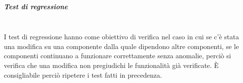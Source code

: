 \subparagraph{Test di regressione} \mbox{}\\
I test di regressione hanno come obiettivo di verifica nel caso in cui se c’è stata una modifica su una componente dalla quale dipendono altre componenti, se le componenti continuano a funzionare correttamente senza anomalie, perciò si verifica che una modifica non pregiudichi le funzionalità già verificate. È consigliabile perciò ripetere i test fatti in precedenza. 

